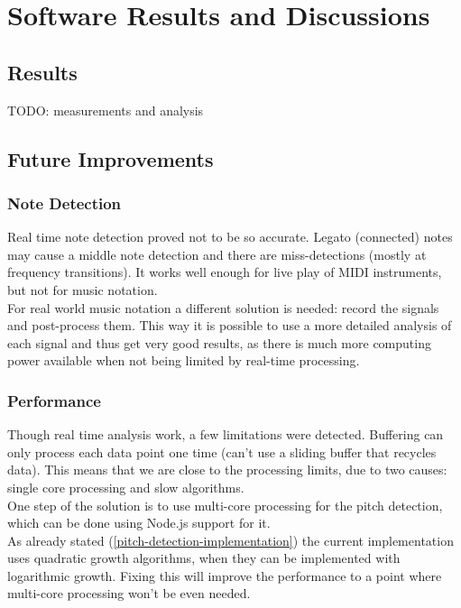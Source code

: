 \section{Software Results and Discussions}

\subsection{Results}
TODO: measurements and analysis

\subsection{Future Improvements}
\subsubsection{Note Detection}
Real time note detection proved not to be so accurate. Legato (connected) notes
may cause a middle note detection and there are miss-detections (mostly at frequency
transitions). It works well enough for live play of MIDI instruments, but not
for music notation. \\
For real world music notation a different solution is needed: record the signals
and post-process them. This way it is possible to use a more detailed analysis
of each signal and thus get very good results, as there is much more computing
power available when not being limited by real-time processing.

\subsubsection{Performance}
Though real time analysis work, a few limitations were detected. Buffering can only
process each data point one time (can't use a sliding buffer that recycles data).
This means that we are close to the processing limits, due to two causes: single
core processing and slow algorithms. \\
One step of the solution is to use multi-core processing for the pitch detection,
which can be done using Node.js support for it. \\
As already stated (\autoref{pitch-detection-implementation}) the current implementation
uses quadratic growth algorithms, when they can be implemented with logarithmic
growth. Fixing this will improve the performance to a point where multi-core processing
won't be even needed.
